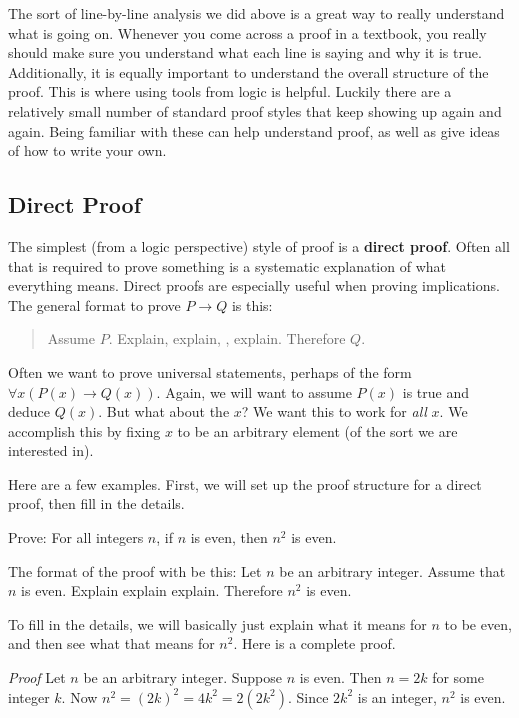 \documentclass[11pt,]{book}
\makeatletter
\newcommand{\terminology}[1]{\textbf{#1}}
\theoremstyle{ptxplainnotitle}
\theoremstyle{ptxplaintitle}
\renewcommand*{\proofname}{Proof}
\renewenvironment{proof}[1][\proofname]{\par
  \pushQED{\qed}%
  \normalfont \topsep6\p@\@plus6\p@\relax
  \trivlist
  \item\relax
    {\itshape
    #1\@addpunct{.}}\hspace\labelsep\ignorespaces
}{%
  \popQED\endtrivlist\@endpefalse
}
\theoremstyle{ptxdefinitionnotitle}
\theoremstyle{ptxdefinitiontitle}
\theoremstyle{ptxdefinitionnotitle}
\theoremstyle{ptxdefinitiontitle}
\theoremstyle{ptxdefinitionnotitle}
\theoremstyle{ptxdefinitiontitle}
\theoremstyle{ptxdefinitiontitlenonumber}
\theoremstyle{ptxdefinitiontitlenonumber}
\numberwithin{equation}{chapter}
\newcommand{\imp}{\rightarrow}
\makeatother
\begin{document}
\par
\hypertarget{p-2298}{}%
The sort of line-by-line analysis we did above is a great way to really understand what is going on. Whenever you come across a proof in a textbook, you really should make sure you understand what each line is saying and why it is true. Additionally, it is equally important to understand the overall structure of the proof. This is where using tools from logic is helpful. Luckily there are a relatively small number of standard proof styles that keep showing up again and again. Being familiar with these can help understand proof, as well as give ideas of how to write your own.%
\typeout{************************************************}
\typeout{************************************************}
\subsection[{Direct Proof}]{Direct Proof}\label{subsection-22}
\hypertarget{p-2299}{}%
%
\par
\hypertarget{p-2300}{}%
The simplest (from a logic perspective) style of proof is a \terminology{direct proof}. Often all that is required to prove something is a systematic explanation of what everything means. Direct proofs are especially useful when proving implications. The general format to prove \(P \imp Q\) is this:%
\begin{quote}\hypertarget{blockquote-10}{}
\hypertarget{p-2301}{}%
Assume \(P\). Explain, explain, \textellipsis{}, explain. Therefore \(Q\).%
\end{quote}
\hypertarget{p-2302}{}%
Often we want to prove universal statements, perhaps of the form \(\forall x (P(x) \imp Q(x))\). Again, we will want to assume \(P(x)\) is true and deduce \(Q(x)\). But what about the \(x\)? We want this to work for \emph{all} \(x\). We accomplish this by fixing \(x\) to be an arbitrary element (of the sort we are interested in).%
\par
\hypertarget{p-2303}{}%
Here are a few examples. First, we will set up the proof structure for a direct proof, then fill in the details.%
\begin{example}\label{example-63}
\hypertarget{p-2304}{}%
Prove: For all integers \(n\), if \(n\) is even, then \(n^2\) is even.%
\par\smallskip%
\noindent\textbf{}\hypertarget{solution-250}{}\hypertarget{p-2305}{}%
The format of the proof with be this: Let \(n\) be an arbitrary integer. Assume that \(n\) is even. Explain explain explain. Therefore \(n^2\) is even.%
\par
\hypertarget{p-2306}{}%
To fill in the details, we will basically just explain what it means for \(n\) to be even, and then see what that means for \(n^2\). Here is a complete proof.%
\begin{proof}\hypertarget{proof-22}{}
\hypertarget{p-2307}{}%
Let \(n\) be an arbitrary integer. Suppose \(n\) is even. Then \(n = 2k\) for some integer \(k\). Now \(n^2 = (2k)^2 = 4k^2 = 2(2k^2)\). Since \(2k^2\) is an integer, \(n^2\) is even.%
\end{proof}
\end{example}
\end{document}
